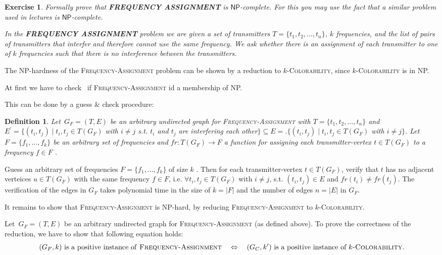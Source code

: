 \documentclass[11pt]{article}
\newtheorem{definition}[theorem]{Definition}
\newtheorem{exercise}[theorem]{Exercise}
\begin{document}
\begin{exercise}
\label{ex:frequency} Formally prove that \textbf{FREQUENCY ASSIGNMENT} is $%
\mathsf{NP}$-complete. For this you may use the fact that a similar problem
used in lectures is $\mathsf{NP}$-complete.

\noindent In the \textbf{FREQUENCY ASSIGNMENT} problem we are given a set of
transmitters $T=\{t_{1},t_{2},\ldots ,t_{n}\}$, $k$ frequencies, and the
list of pairs of transmitters that interfer and therefore cannot use the
same frequency. We ask whether there is an assignment of each transmitter to
one of $k$ frequencies such that there is no interference between the
transmitters.
\end{exercise}

The NP-hardness of the \textsc{Frequency-Assignment} problem can be shown by
a reduction to $k$\textsc{-Colorability}, since $k$\textsc{-Colorability} is
in NP.

At first we have to check \ if \textsc{Frequency-Assignment} id a membership
of NP.

This can be done by a guess \& check procedure:

\begin{definition}
Let\ $G_{F}=(T,E)$ be an arbitrary undirected graph for \textsc{%
Frequency-Assignment} with $T=\{t_{1},t_{2},\ldots ,t_{n}\}$ and $E^{\prime
}=\{(t_{i},t_{j})\mid t_{i},t_{j}\in T(G_{F})$ with $i\neq j$ s.t. $t_{i}$
and $t_{j}$ are interfering each other$\}\subseteq E=$.$\{(t_{i},t_{j})\mid
t_{i},t_{j}\in T(G_{F})$ with $i\neq j\}$. Let $F=\{f_{1},\ldots ,f_{k}\}$
be an arbitrary set of frequencies and $fr:T(G_{F})\rightarrow F$ a function
for assigning each transmitter-vertex $t\in T(G_{F})$ to a frequency $f\in F$%
.
\end{definition}

Guess an arbitrary set of frequencies $F=\{f_{1},\ldots ,f_{k}\}$ of size $k$%
. Then for each transmitter-vertex $t\in T(G_{F})$, verify that $t$ has no
adjacent verteices $u\in T(G_{F})$ with the same frequency $f\in F$, i.e. $%
\forall t_{i},t_{j}\in T(G_{F})$ with $i\neq j$, s.t. $(t_{i},t_{j})\in E$
and $fr(t_{i})\neq fr(t_{j})$. The verification of the edges in $G_{F}$
takes polynomial time in the size of $k=|F|$ and the number of edges $n=|E|$
in $G_{F}$.

It remains to show that \textsc{Frequency-Assignment} is NP-hard, by
reducing \textsc{Frequency-Assignment} to $k$\textsc{-Colorability}.

Let\ $G_{F}=(T,E)$ be an arbitrary undirected graph for \textsc{%
Frequency-Assignment} (as defined above). To prove the correctness of the
reduction, we have to show that following equation holds:%
\begin{equation*}
(G_{F},k)\text{ is a positive instance of \textsc{Frequency-Assignment}}%
\quad \Leftrightarrow \quad (G_{C},k^{\prime })\text{ is a positive instance
of }k\text{\textsc{-Colorability}.}
\end{equation*}
\end{document}
